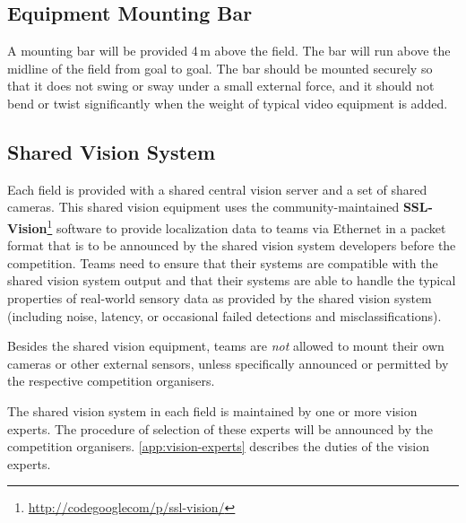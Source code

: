 \subsection{Equipment Mounting Bar}
A mounting bar will be provided 4\,m above the field.
The bar will run above the midline of the field from goal to goal.
The bar should be mounted securely so that it does not swing or sway under a small external force, and it should not bend or twist significantly when the weight of typical video equipment is added.

\subsection{Shared Vision System}
Each field is provided with a shared central vision server and a set of shared cameras.
This shared vision equipment uses the community-maintained \textbf{SSL-Vision}\footnote{\url{http://codegooglecom/p/ssl-vision/}} software to provide localization data to teams via Ethernet in a packet format that is to be announced by the shared vision system developers before the competition.
Teams need to ensure that their systems are compatible with the shared vision system output and that their systems are able to handle the typical properties of real-world sensory data as provided by the shared vision system (including noise, latency, or occasional failed detections and misclassifications).

Besides the shared vision equipment, teams are \emph{not} allowed to mount their own cameras or other external sensors, unless specifically announced or permitted by the respective competition organisers.

The shared vision system in each field is maintained by one or more vision experts.
The procedure of selection of these experts will be announced by the competition organisers.
\autoref{app:vision-experts} describes the duties of the vision experts.

